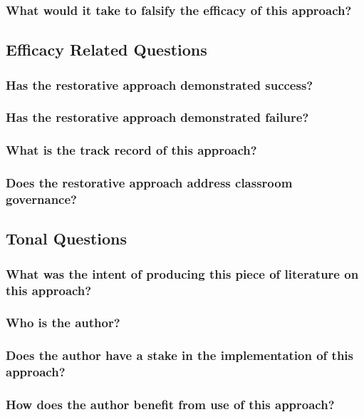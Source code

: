 \documentclass[12pt]{article}
\begin{document}
	\subsubsection{What would it take to falsify the efficacy of this approach?}
	\subsection{Efficacy Related Questions}
	\subsubsection{Has the restorative approach demonstrated success?}
	\subsubsection{Has the restorative approach demonstrated failure?}
	\subsubsection{What is the track record of this approach?}
	\subsubsection{Does the restorative approach address classroom governance?}
	\subsection{Tonal Questions}
	\subsubsection{What was the intent of producing this piece of literature on this approach?}
	\subsubsection{Who is the author?}
	\subsubsection{Does the author have a stake in the implementation of this approach?}
	\subsubsection{How does the author benefit from use of this approach?}
\end{document}

